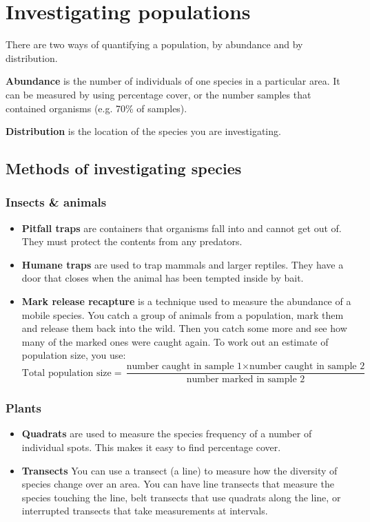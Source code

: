 \documentclass{article}
\begin{document}
\section*{Investigating populations}
There are two ways of quantifying a population, by abundance and by distribution.

\textbf{Abundance} is the number of individuals of one species in a particular area. It can be measured by using percentage cover, or the number samples that contained organisms (e.g. 70\% of samples).

\textbf{Distribution} is the location of the species you are investigating.

\subsection*{Methods of investigating species}
\subsubsection*{Insects \& animals}
\begin{itemize}
	\item \textbf{Pitfall traps} are containers that organisms fall into and cannot get out of. They must protect the contents from any predators.
	\item \textbf{Humane traps} are used to trap mammals and larger reptiles. They have a door that closes when the animal has been tempted inside by bait.
	\item \textbf{Mark release recapture} is a technique used to measure the abundance of a mobile species. You catch a group of animals from a population, mark them and release them back into the wild. Then you catch some more and see how many of the marked ones were caught again. To work out an estimate of population size, you use:
	\[
		\textrm{Total population size} = \frac{\textrm{number caught in sample 1} \times \textrm{number caught in sample 2}}{\textrm{number marked in sample 2}}
	\]
\end{itemize}
\subsubsection*{Plants}
\begin{itemize}
	\item \textbf{Quadrats} are used to measure the species frequency of a number of individual spots. This makes it easy to find percentage cover.
	\item \textbf{Transects} You can use a transect (a line) to measure how the diversity of species change over an area. You can have line transects that measure the species touching the line, belt transects that use quadrats along the line, or interrupted transects that take measurements at intervals.
\end{itemize}
\end{document}
